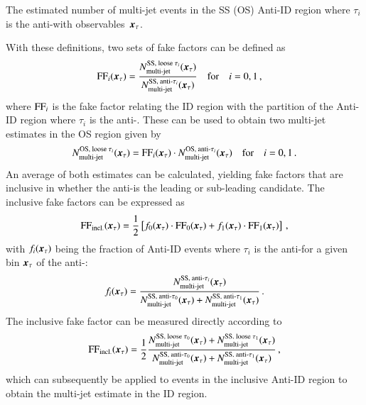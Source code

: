 {\begin{description}[style=standard]
  \item[$\NmjAntiID{SS(OS)}{i}\ffargs$] The estimated number of
    multi-jet events in the SS (OS) Anti-ID region where $\tau_i$ is
    the anti-\tauhadvis with observables~$\myvec{x}_\tau$.
  \end{description}
  With these definitions, two sets of fake factors can be defined as
  \begin{align*}
    \FF_{i}\ffargs &= \frac{\NmjID{SS}{i} \ffargs}{\NmjAntiID{SS}{i}\ffargs}
                     \quad \text{for} \quad i = 0, 1 \,\text{,}
  \end{align*}
  where $\text{FF}_{i}$ is the fake factor relating the ID region with the
  partition of the Anti-ID region where $\tau_i$ is the
  anti-\tauhadvis. These can be used to obtain two multi-jet estimates
  in the OS region given by
  \begin{align*}
    \NmjID{OS}{i}\ffargs = \FF_{i}\ffargs \cdot \NmjAntiID{OS}{i}\ffargs
    \quad \text{for} \quad i = 0, 1 \,\text{.}
  \end{align*}
  An average of both estimates can be calculated, yielding fake
  factors that are inclusive in whether the anti-\tauhadvis is the
  leading or sub-leading \tauhadvis candidate. The inclusive fake
  factors can be expressed as
  \begin{align*}
    \FF_\text{incl.}\ffargs = \frac{1}{2} \left[ f_0\ffargs \cdot \FF_0\ffargs
    + f_1\ffargs \cdot \FF_1\ffargs \right] \,\text{,}
  \end{align*}
  with $f_i\ffargs$ being the fraction of Anti-ID events where
  $\tau_i$ is the anti-\tauhadvis for a given bin $\myvec{x}_\tau$ of
  the anti-\tauhadvis:
  \begin{align*}
    f_i\ffargs = \frac{\NmjAntiID{SS}{i}\ffargs}
                      {\NmjAntiID{SS}{0}\ffargs + \NmjAntiID{SS}{1}\ffargs} \,\text{.}
  \end{align*}
  The inclusive fake factor can be measured directly according to
  \begin{align}
    \FF_\text{incl.}\ffargs
    = \frac{1}{2} \frac{ \NmjID{SS}{0}\ffargs + \NmjID{SS}{1}\ffargs }
                       { \NmjAntiID{SS}{0}\ffargs + \NmjAntiID{SS}{1}\ffargs } \,\text{,}
    \label{eq:inclusive_fake_factor}
  \end{align}
  which can subsequently be applied to events in the inclusive Anti-ID
  region to obtain the multi-jet estimate in the ID region.



}
